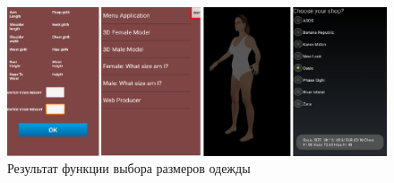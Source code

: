 \begin{figure}[ht!]
\centering
\includegraphics [scale=0.5] {images/h43.png}
\begin{center}
\caption{Результат функции выбора размеров одежды} \label{img43}
\end{center}
\end{figure}

